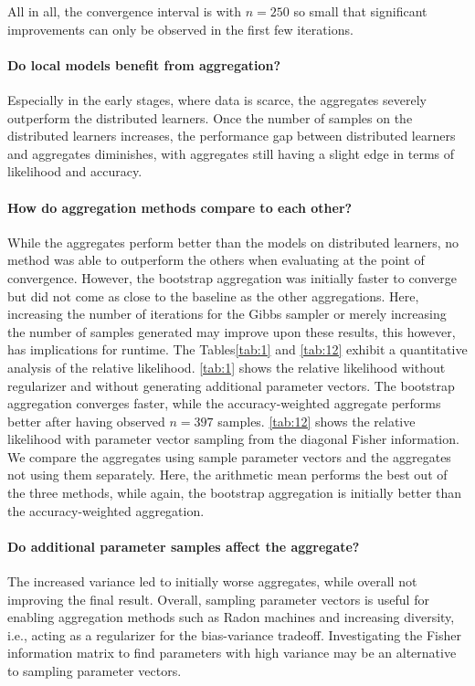 All in all, the convergence interval is with $n=250$ so small that significant improvements can only be observed in the first few iterations.

\paragraph*{Do local models benefit from aggregation?}
Especially in the early stages, where data is scarce, the aggregates severely outperform the distributed learners.
Once the number of samples on the distributed learners increases, the performance gap between distributed learners and aggregates diminishes, with aggregates still having a slight edge in terms of likelihood and accuracy.

\paragraph*{How do aggregation methods compare to each other?}
While the aggregates perform better than the models on distributed learners, no method was able to outperform the others when evaluating at the point of convergence.
However, the bootstrap aggregation was initially faster to converge but did not come as close to the baseline as the other aggregations.
Here, increasing the number of iterations for the Gibbs sampler or merely increasing the number of samples generated may improve upon these results, this however, has implications for runtime.
The Tables\ref{tab:1} and \ref{tab:12} exhibit a quantitative analysis of the relative likelihood.
\autoref{tab:1} shows the relative likelihood without regularizer and without generating additional parameter vectors.
The bootstrap aggregation converges faster, while the accuracy-weighted aggregate performs better after having observed $n=397$ samples.
\autoref{tab:12} shows the relative likelihood with parameter vector sampling from the diagonal Fisher information. 
We compare the aggregates using sample parameter vectors and the aggregates not using them separately.
Here, the arithmetic mean performs the best out of the three methods, while again, the bootstrap aggregation is initially better than the accuracy-weighted aggregation.


\paragraph*{Do additional parameter samples affect the aggregate?}
The increased variance led to initially worse aggregates, while overall not improving the final result.
Overall, sampling parameter vectors is useful for enabling aggregation methods such as Radon machines and increasing diversity, i.e., acting as a regularizer for the bias-variance tradeoff.
Investigating the Fisher information matrix to find parameters with high variance may be an alternative to sampling parameter vectors.

